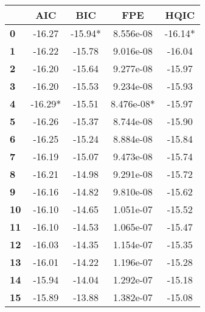 \begin{center}
\begin{tabular}{lcccc}
\toprule
            & \textbf{AIC} & \textbf{BIC} & \textbf{FPE} & \textbf{HQIC}  \\
\midrule
\textbf{0}  &      -16.27  &     -15.94*  &   8.556e-08  &      -16.14*   \\
\textbf{1}  &      -16.22  &      -15.78  &   9.016e-08  &       -16.04   \\
\textbf{2}  &      -16.20  &      -15.64  &   9.277e-08  &       -15.97   \\
\textbf{3}  &      -16.20  &      -15.53  &   9.234e-08  &       -15.93   \\
\textbf{4}  &     -16.29*  &      -15.51  &  8.476e-08*  &       -15.97   \\
\textbf{5}  &      -16.26  &      -15.37  &   8.744e-08  &       -15.90   \\
\textbf{6}  &      -16.25  &      -15.24  &   8.884e-08  &       -15.84   \\
\textbf{7}  &      -16.19  &      -15.07  &   9.473e-08  &       -15.74   \\
\textbf{8}  &      -16.21  &      -14.98  &   9.291e-08  &       -15.72   \\
\textbf{9}  &      -16.16  &      -14.82  &   9.810e-08  &       -15.62   \\
\textbf{10} &      -16.10  &      -14.65  &   1.051e-07  &       -15.52   \\
\textbf{11} &      -16.10  &      -14.53  &   1.065e-07  &       -15.47   \\
\textbf{12} &      -16.03  &      -14.35  &   1.154e-07  &       -15.35   \\
\textbf{13} &      -16.01  &      -14.22  &   1.196e-07  &       -15.28   \\
\textbf{14} &      -15.94  &      -14.04  &   1.292e-07  &       -15.18   \\
\textbf{15} &      -15.89  &      -13.88  &   1.382e-07  &       -15.08   \\
\bottomrule
\end{tabular}
\end{center}
